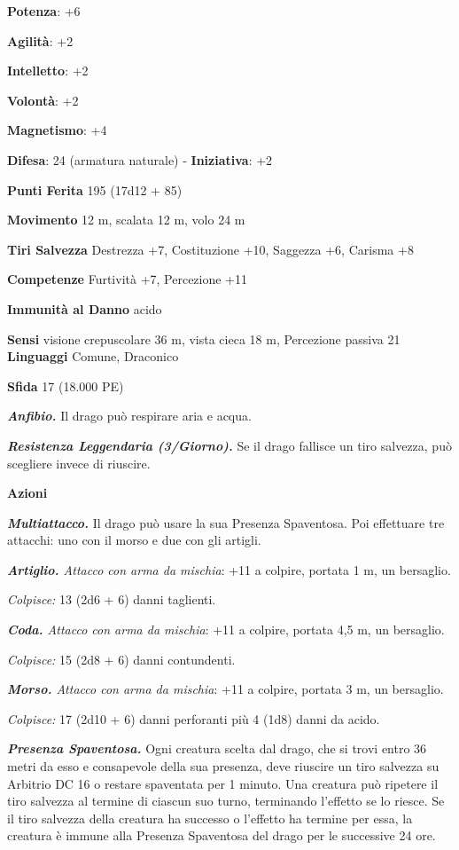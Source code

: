 \begin{multicols}{2}
\textbf{Potenza}: +6

\textbf{Agilità}: +2

\textbf{Intelletto}: +2

\textbf{Volontà}: +2

\textbf{Magnetismo}: +4

\textbf{Difesa}: 24 (armatura naturale) - \textbf{Iniziativa}: +2

\textbf{Punti Ferita} 195 (17d12 + 85)

\textbf{Movimento} 12 m, scalata 12 m, volo 24 m

\textbf{Tiri Salvezza} Destrezza +7, Costituzione +10, Saggezza +6,
Carisma +8

\textbf{Competenze} Furtività +7, Percezione +11

\textbf{Immunità al Danno} acido

\textbf{Sensi} visione crepuscolare 36 m, vista cieca 18 m, Percezione passiva
21 \textbf{Linguaggi} Comune, Draconico

\textbf{Sfida} 17 (18.000 PE)\smallskip

\emph{\textbf{Anfibio.}} Il drago può respirare aria e acqua.

\emph{\textbf{Resistenza Leggendaria (3/Giorno).}} Se il drago fallisce
un tiro salvezza, può scegliere invece di riuscire.

\smallskip\textbf{Azioni}

\emph{\textbf{Multiattacco.}} Il drago può usare la sua Presenza
Spaventosa. Poi effettuare tre attacchi: uno con il morso e due con gli
artigli.

\emph{\textbf{Artiglio.} Attacco con arma da mischia}: +11 a colpire,
portata 1 m, un bersaglio.

\emph{Colpisce:} 13 (2d6 + 6) danni taglienti.

\emph{\textbf{Coda.} Attacco con arma da mischia}: +11 a colpire,
portata 4,5 m, un bersaglio.

\emph{Colpisce:} 15 (2d8 + 6) danni contundenti.

\emph{\textbf{Morso.} Attacco con arma da mischia}: +11 a colpire,
portata 3 m, un bersaglio.

\emph{Colpisce:} 17 (2d10 + 6) danni perforanti più 4 (1d8) danni da
acido.

\emph{\textbf{Presenza Spaventosa.}} Ogni creatura scelta dal drago, che
si trovi entro 36 metri da esso e consapevole della sua presenza, deve
riuscire un tiro salvezza su Arbitrio DC 16 o restare spaventata per 1
minuto. Una creatura può ripetere il tiro salvezza al termine di ciascun
suo turno, terminando l'effetto se lo riesce. Se il tiro salvezza della
creatura ha successo o l'effetto ha termine per essa, la creatura è
immune alla Presenza Spaventosa del drago per le successive 24 ore.


\end{multicols}
